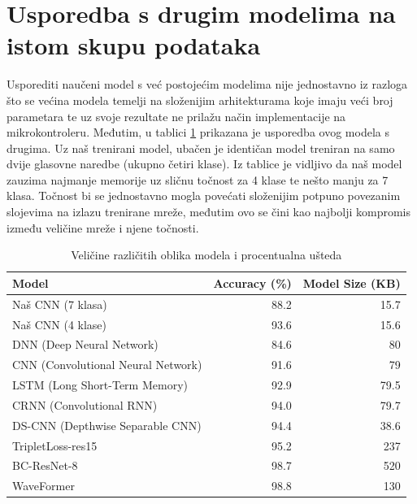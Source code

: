 \section{Usporedba s drugim modelima na istom skupu podataka}

Usporediti naučeni model s već postojećim modelima nije jednostavno iz razloga što
se većina modela temelji na složenijim arhitekturama koje imaju veći broj parametara te
uz svoje rezultate ne prilažu način implementacije na mikrokontroleru. Međutim,
u tablici \ref{tab:models} prikazana je usporedba ovog modela s drugima. Uz naš trenirani model,
ubačen je identičan model treniran na samo dvije glasovne naredbe (ukupno četiri klase).
Iz tablice je vidljivo da naš model zauzima najmanje memorije uz sličnu točnost za 4 klase te
nešto manju za 7 klasa. Točnost bi se jednostavno mogla povećati složenijim potpuno povezanim
slojevima na izlazu trenirane mreže, međutim ovo se čini kao najbolji kompromis između veličine
mreže i njene točnosti.

\begin{table}[htb]
    \centering
    \begin{tabular}{|l|r|r|}
        \hline
        \textbf{Model} & \textbf{Accuracy (\%)} & \textbf{Model Size (KB)} \\ \hline
        Naš CNN (7 klasa) & 88.2 & 15.7 \\ 
        Naš CNN (4 klase) & 93.6& 15.6 \\ 
        DNN (Deep Neural Network)          \cite{zhang2017hello} & 84.6 & 80 \\
        CNN (Convolutional Neural Network) \cite{zhang2017hello} & 91.6 & 79 \\
        LSTM (Long Short-Term Memory)      \cite{zhang2017hello} & 92.9 &79.5 \\
        CRNN (Convolutional RNN)           \cite{zhang2017hello} & 94.0 & 79.7 \\
        DS-CNN (Depthwise Separable CNN)   \cite{zhang2017hello} & 94.4 & 38.6  \\
        TripletLoss-res15 \cite{triplet} & 95.2 & 237 \\
        BC-ResNet-8 \cite{res} & 98.7 & 520 \\
        WaveFormer \cite{waveformer} & 98.8 & 130  \\
        \hline
    \end{tabular}
    \caption{Veličine različitih oblika modela i procentualna ušteda}
    \label{tab:models}
\end{table}
